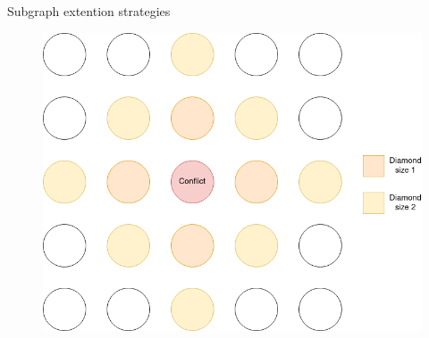\begin{frame}[fragile]{Subgraph extention strategies}
    \begin{figure}[H]
        \centering
        \includegraphics[width=\widthimg]{img/diamond.drawio.png}
      \end{figure}
      
\end{frame}